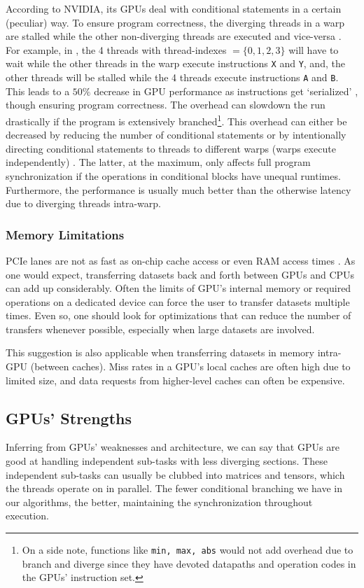 According to NVIDIA, its GPUs deal with conditional statements in a certain (peculiar) way. To ensure program correctness, the diverging threads in a warp are stalled while the other non-diverging threads are executed and vice-versa \cite{CUDADocs,ParallelNVIDIA}. For example, in , the 4 threads with thread-indexes $=\{0,1,2,3\}$ will have to wait while the other threads in the warp execute instructions \texttt{X} and \texttt{Y}, and, the other threads will be stalled while the 4 threads execute instructions \texttt{A} and \texttt{B}. This leads to a $50\%$ decrease in GPU performance as instructions get `serialized' \cite{ParallelNVIDIA}, though ensuring program correctness. The overhead can slowdown the run drastically if the program is extensively branched\footnote{On a side note, functions like \texttt{min, max, abs} would not add overhead due to branch and diverge since they have devoted datapaths and operation codes in the GPUs' instruction set.}. This overhead can either be decreased by reducing the number of conditional statements or by intentionally directing conditional statements to threads to different warps (warps execute independently) \cite{ParallelNVIDIA}. The latter, at the maximum, only affects full program synchronization if the operations in conditional blocks have unequal runtimes. Furthermore, the performance is usually much better than the otherwise latency due to diverging threads intra-warp.

\subsubsection{Memory Limitations}
PCIe lanes are not as fast as on-chip cache access or even RAM access times \cite{CUDADocs, ParallelNVIDIA}. As one would expect, transferring datasets back and forth between GPUs and CPUs can add up considerably. Often the limits of GPU's internal memory or required operations on a dedicated device can force the user to transfer datasets multiple times. Even so, one should look for optimizations that can reduce the number of transfers whenever possible, especially when large datasets are involved.

This suggestion is also applicable when transferring datasets in memory intra-GPU (between caches). Miss rates in a GPU's local caches are often high due to limited size, and data requests from higher-level caches can often be expensive.

\subsection{GPUs' Strengths} \label{sec:Gpu's Strengths}
Inferring from GPUs' weaknesses and architecture, we can say that GPUs are good at handling independent sub-tasks with less diverging sections. These independent sub-tasks can usually be clubbed into matrices and tensors, which the threads operate on in parallel. The fewer conditional branching we have in our algorithms, the better, maintaining the synchronization throughout execution.

